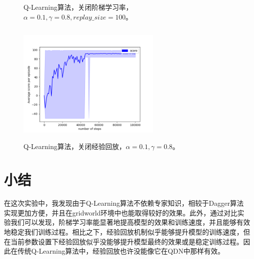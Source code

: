 \documentclass[a4paper,12pt]{article}
\begin{document}
\begin{CJK}{UTF8}{gbsn}
\begin{figure}[h!]
	\caption{Q-Learning算法，关闭阶梯学习率，$\alpha=0.1,\gamma=0.8,replay\_size=100$。}
	\label{performance}
\end{figure}
\begin{figure}[h!]
	\centering
	\includegraphics[width=7cm,height=6cm]{./code/performance_al=0.1_ga=0.8_laal=T.png}
	\caption{Q-Learning算法，关闭经验回放，$\alpha=0.1,\gamma=0.8$。}
	\label{performance}
\end{figure}
\section{小结}
在这次实验中，我发现由于Q-Learning算法不依赖专家知识，相较于Dagger算法实现更加方便，并且在gridworld环境中也能取得较好的效果。此外，通过对比实验我们可以发现，阶梯学习率能显著地提高模型的效果和训练速度，并且能够有效地稳定我们训练过程。相比之下，经验回放机制似乎能够提升模型的训练速度，但在当前参数设置下经验回放似乎没能够提升模型最终的效果或是稳定训练过程。因此在传统Q-Learning算法中，经验回放也许没能像它在QDN中那样有效。

\end{CJK}
\end{document}
